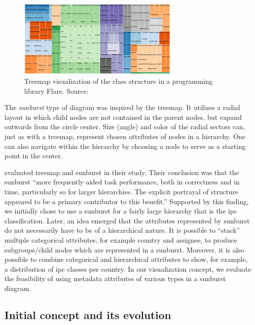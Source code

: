 \begin{figure}[!]
\centering
\includegraphics[width=0.7\textwidth]{img/treemap}
\caption{Treemap visualization of the class structure in a programming library Flare. Source: \cite{Takayuki2016}}
\label{fig:treemap}
\end{figure}

The \textit{sunburst} type of diagram was inspired by the treemap. 
It utilizes a radial layout in which child nodes are not contained in the parent nodes, but expand outwards from the circle center.
Size (angle) and color of the radial sectors can, just as with a treemap, represent chosen attributes of nodes in a hierarchy.
One can also navigate within the hierarchy by choosing a node to serve as a starting point in the center.

\cite{Stasko2000} evaluated treemap and sunburst in their study.
Their conclusion was that the sunburst ``more frequently aided task performance, both in correctness and in time, particularly so for larger hierarchies. The explicit portrayal of structure appeared to be a primary contributor to this benefit.''
Supported by this finding, we initially chose to use a sunburst for a fairly large hierarchy that is the \gls{ipc} classification.
Later, an idea emerged that the attributes represented by sunburst do not necessarily have to be of a hierarchical nature.
It is possible to ``stack'' multiple categorical attributes, for example country and assignee, to produce subgroups/child nodes which are represented in a sunburst.
Moreover, it is also possible to combine categorical and hierarchical attributes to show, for example, a distribution of \gls{ipc} classes per country.
In our visualization concept, we evaluate the feasibility of using metadata attributes of various types in a sunburst diagram.

\subsection{Initial concept and its evolution}
\label{subsec:initial_concept}

